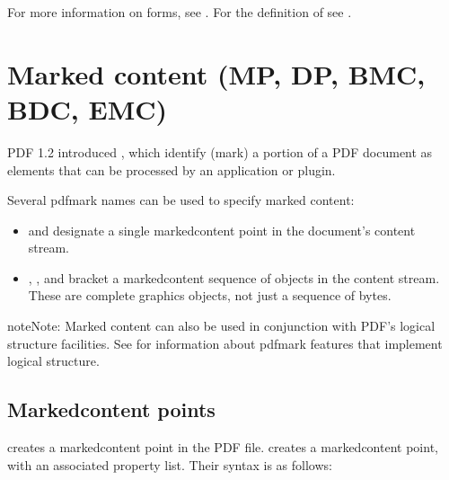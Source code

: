 \documentclass[letterpaper,12pt,english,openany,oneside]{sphinxmanual}
\begin{document}
For more information on forms, see . For the definition of  see .


\section{Marked content (MP, DP, BMC, BDC, EMC)}
\label{\detokenize{pdfmark_Basic:marked-content-mp-dp-bmc-bdc-emc}}
PDF 1.2 introduced  , which identify (mark) a portion of a PDF document as elements that can be processed by an application or plug\sphinxhyphen{}in.

Several pdfmark names can be used to specify marked content:
\begin{itemize}
\item {} 
 and  designate a single marked\sphinxhyphen{}content point in the document’s content stream.

\item {} 
 ,  , and  bracket a marked\sphinxhyphen{}content sequence of objects in the content stream. These are complete graphics objects, not just a sequence of bytes.

\end{itemize}

\begin{sphinxadmonition}{note}{Note:}
Marked content can also be used in conjunction with PDF’s logical structure facilities. See  for information about pdfmark features that implement logical structure.
\end{sphinxadmonition}


\subsection{Marked\sphinxhyphen{}content points}
\label{\detokenize{pdfmark_Basic:marked-content-points}}
 creates a marked\sphinxhyphen{}content point in the PDF file.  creates a marked\sphinxhyphen{}content point, with an associated property list. Their syntax is as follows:

\begin{sphinxVerbatim}[commandchars=\\\{\}]
 \PYG{p}{[}

         
    \PYG{p}{[}

         
\end{sphinxVerbatim}
\end{document}
